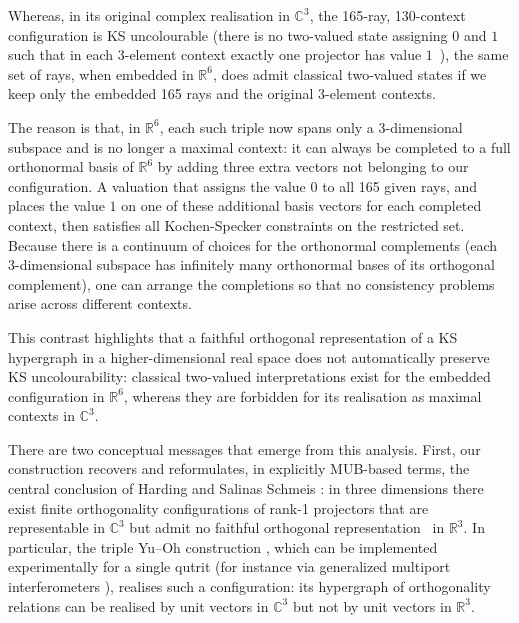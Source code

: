 \documentclass[%
  reprint,
  superscriptaddress,
  amsmath,amssymb,
  pra,
  floatfix,
  longbibliography
]{revtex4-2}
\begin{document}
Whereas, in its original complex realisation in $\mathbb{C}^3$, the 165-ray,
130-context configuration is KS uncolourable (there is no
two-valued state assigning $0$ and $1$ such that in each 3-element context
exactly one projector has value $1$~\cite{Cabello2025}), the same set of rays, when embedded
in $\mathbb{R}^6$, does admit classical two-valued states if we keep only
the embedded 165 rays and the original 3-element contexts.

The reason is that, in $\mathbb{R}^6$, each such triple now spans only a
3-dimensional subspace and is no longer a maximal context: it can always be
completed to a full orthonormal basis of $\mathbb{R}^6$ by adding three extra
vectors not belonging to our configuration. A valuation that assigns the
value $0$ to all 165 given rays, and places the value $1$ on one of these
additional basis vectors for each completed context, then satisfies all
Kochen-Specker constraints on the restricted set. Because there is a
continuum of choices for the orthonormal complements (each 3-dimensional
subspace has infinitely many orthonormal bases of its orthogonal complement),
one can arrange the completions so that no consistency problems arise across
different contexts.

This contrast highlights that a faithful orthogonal representation of a KS
hypergraph in a higher-dimensional real space does not automatically preserve
KS uncolourability: classical two-valued interpretations exist for the
embedded configuration in $\mathbb{R}^6$, whereas they are forbidden for its
realisation as maximal contexts in $\mathbb{C}^3$.

There are two conceptual messages that emerge from this analysis.
First, our construction recovers and reformulates, in explicitly MUB-based
terms, the central conclusion of Harding and Salinas Schmeis
\cite{harding2025remarksIJTP}: in three dimensions there exist finite
orthogonality configurations of rank-1 projectors that are representable in
$\mathbb{C}^3$ but admit no faithful orthogonal representation~\cite{lovasz-79} in
$\mathbb{R}^3$. In particular, the triple Yu--Oh construction
\cite{Yu-2012,Cabello2025}, which can be implemented experimentally for a
single qutrit (for instance via generalized multiport interferometers
\cite{rzbb}), realises such a configuration: its hypergraph of orthogonality
relations can be realised by unit vectors in $\mathbb{C}^3$ but not by unit
vectors in $\mathbb{R}^3$.
\end{document}
